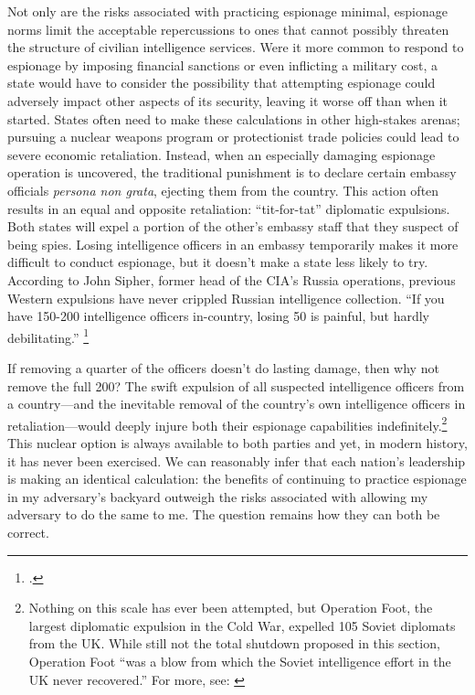 \documentclass[14pt]{extarticle}
\begin{document}

Not only are the risks associated with practicing espionage minimal, espionage norms limit the acceptable repercussions to ones that cannot possibly threaten the structure of civilian intelligence services. Were it more common to respond to espionage by imposing financial sanctions or even inflicting a military cost, a state would have to consider the possibility that attempting espionage could adversely impact other aspects of its security, leaving it worse off than when it started. States often need to make these calculations in other high-stakes arenas; pursuing a nuclear weapons program or protectionist trade policies could lead to severe economic retaliation. Instead, when an especially damaging espionage operation is uncovered, the traditional punishment is to declare certain embassy officials \emph{persona non grata}, ejecting them from the country. This action often results in an equal and opposite retaliation: \enquote{tit-for-tat} diplomatic expulsions. Both states will expel a portion of the other's embassy staff that they suspect of being spies. Losing intelligence officers in an embassy temporarily makes it more difficult to conduct espionage, but it doesn't make a state less likely to try. According to John Sipher, former head of the CIA's Russia operations, previous Western expulsions have never crippled Russian intelligence collection. \enquote{If you have 150-200 intelligence officers in-country, losing 50 is painful, but hardly debilitating.} \footcite{dettmer_united_2018}

If removing a quarter of the officers doesn't do lasting damage, then why not remove the full 200? The swift expulsion of all suspected intelligence officers from a country---and the inevitable removal of the country's own intelligence officers in retaliation---would deeply injure both their espionage capabilities indefinitely.\footnote{Nothing on this scale has ever been attempted, but Operation Foot, the largest diplomatic expulsion in the Cold War, expelled 105 Soviet diplomats from the UK. While still not the total shutdown proposed in this section, Operation Foot \enquote{was a blow from which the Soviet intelligence effort in the UK never recovered.} For more, see: \cite{hughes_giving_2006-1}} This nuclear option is always available to both parties and yet, in modern history, it has never been exercised. We can reasonably infer that each nation's leadership is making an identical calculation: the benefits of continuing to practice espionage in my adversary's backyard outweigh the risks associated with allowing my adversary to do the same to me. The question remains how they can both be correct.
\end{document}
